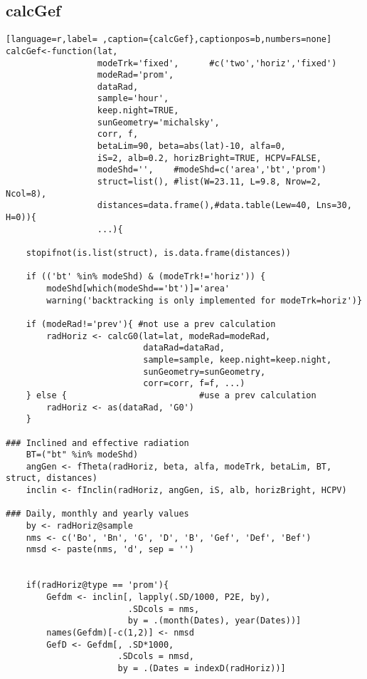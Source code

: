 \subsection{calcGef}
\label{sec:orgec2fc7e}
\label{subsec:calcgef}
\begin{lstlisting}[language=r,label= ,caption={calcGef},captionpos=b,numbers=none]
calcGef<-function(lat,
                  modeTrk='fixed',      #c('two','horiz','fixed')
                  modeRad='prom', 
                  dataRad,
                  sample='hour',
                  keep.night=TRUE,
                  sunGeometry='michalsky',
                  corr, f,
                  betaLim=90, beta=abs(lat)-10, alfa=0,
                  iS=2, alb=0.2, horizBright=TRUE, HCPV=FALSE,
                  modeShd='',    #modeShd=c('area','bt','prom')
                  struct=list(), #list(W=23.11, L=9.8, Nrow=2, Ncol=8), 
                  distances=data.frame(),#data.table(Lew=40, Lns=30, H=0)){
                  ...){

    stopifnot(is.list(struct), is.data.frame(distances))

    if (('bt' %in% modeShd) & (modeTrk!='horiz')) {
        modeShd[which(modeShd=='bt')]='area'
        warning('backtracking is only implemented for modeTrk=horiz')}

    if (modeRad!='prev'){ #not use a prev calculation
        radHoriz <- calcG0(lat=lat, modeRad=modeRad,
                           dataRad=dataRad,
                           sample=sample, keep.night=keep.night,
                           sunGeometry=sunGeometry,
                           corr=corr, f=f, ...)
    } else {                          #use a prev calculation
        radHoriz <- as(dataRad, 'G0') 
    } 

### Inclined and effective radiation
    BT=("bt" %in% modeShd) 
    angGen <- fTheta(radHoriz, beta, alfa, modeTrk, betaLim, BT, struct, distances)
    inclin <- fInclin(radHoriz, angGen, iS, alb, horizBright, HCPV)

### Daily, monthly and yearly values
    by <- radHoriz@sample
    nms <- c('Bo', 'Bn', 'G', 'D', 'B', 'Gef', 'Def', 'Bef')
    nmsd <- paste(nms, 'd', sep = '')


    if(radHoriz@type == 'prom'){
        Gefdm <- inclin[, lapply(.SD/1000, P2E, by),
                        .SDcols = nms,
                        by = .(month(Dates), year(Dates))]
        names(Gefdm)[-c(1,2)] <- nmsd
        GefD <- Gefdm[, .SD*1000,
                      .SDcols = nmsd,
                      by = .(Dates = indexD(radHoriz))]


\end{lstlisting}
